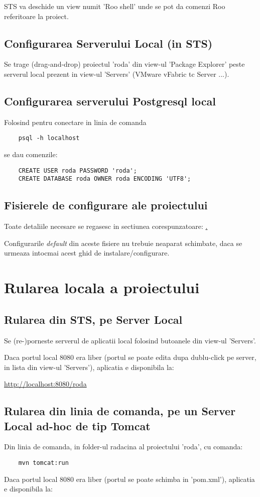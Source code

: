 STS va deschide un view numit 'Roo shell' unde se pot da comenzi Roo referitoare
la proiect.

\subsection{Configurarea Serverului Local (in STS)}
Se trage (drag-and-drop) proiectul 'roda' din view-ul 'Package Explorer' 
peste serverul local prezent in view-ul 'Servers' (VMware vFabric tc Server ...).

\subsection{Configurarea serverului Postgresql local}
Folosind pentru conectare in linia de comanda
\begin{lstlisting}
	psql -h localhost
\end{lstlisting}
se dau comenzile:
\begin{lstlisting}
	CREATE USER roda PASSWORD 'roda';
	CREATE DATABASE roda OWNER roda ENCODING 'UTF8';
\end{lstlisting}

\subsection{Fisierele de configurare ale proiectului}
Toate detaliile necesare se regasesc in sectiunea
corespunzatoare: \href{fisiere_configurare}.

Configurarile \emph{default} din aceste fisiere nu trebuie neaparat
schimbate, daca se urmeaza intocmai acest ghid de instalare/configurare.

\section{Rularea locala a proiectului}

\subsection{Rularea din STS, pe Server Local}
Se (re-)porneste serverul de aplicatii local folosind butoanele din view-ul
'Servers'.

Daca portul local 8080 era liber (portul se poate edita dupa dublu-click pe
server, in lista din view-ul 'Servers'), aplicatia e disponibila la:

\url{http://localhost:8080/roda}

\subsection{Rularea din linia de comanda, pe un Server Local ad-hoc de tip
Tomcat}
Din linia de comanda, in folder-ul radacina al proiectului 'roda', cu comanda:
\begin{lstlisting}
	mvn tomcat:run
\end{lstlisting}
Daca portul local 8080 era liber (portul se poate schimba in 'pom.xml'),
aplicatia e disponibila la:

